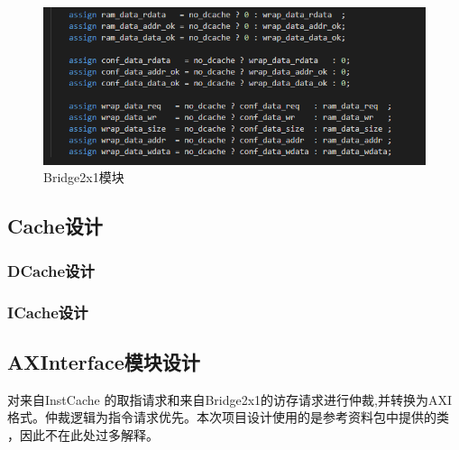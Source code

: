 \begin{figure}
\centering
\includegraphics[width=0.5\linewidth]{image/p13.png}
\caption{Bridge2x1模块}
\label{fig:enter-label}
\end{figure}
\begin{flushleft}
\subsection{ Cache设计}
\subsubsection{DCache设计}

\subsubsection{ICache设计}
\end{flushleft}



\begin{flushleft}
\subsection{AXInterface模块设计}
对来自InstCache 的取指请求和来自Bridge2x1的访存请求进行仲裁,并转换为AXI格式。仲裁逻辑为指令请求优先。本次项目设计使用的是参考资料包中提供的类 ，因此不在此处过多解释。
\end{flushleft}

